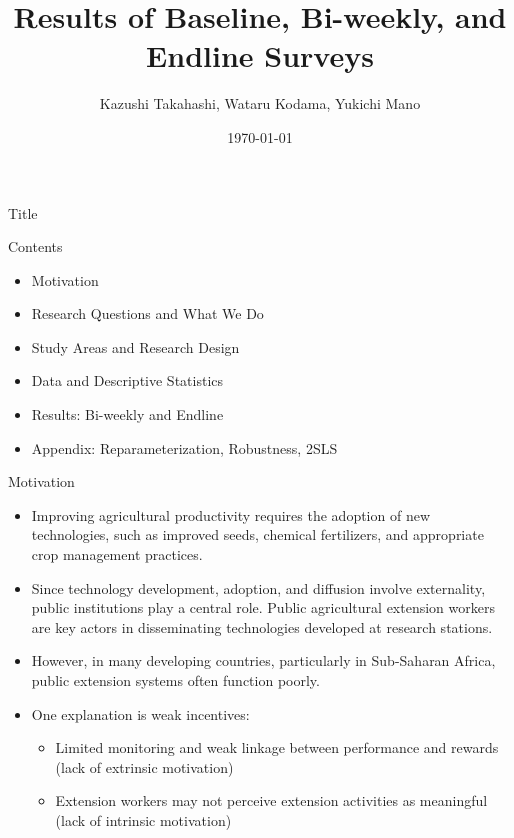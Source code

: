 \documentclass[aspectratio=169]{beamer}
\title[Short Title]{Results of Baseline, Bi-weekly, and Endline Surveys}
\author[Takahashi et al.]{Kazushi Takahashi, Wataru Kodama, Yukichi Mano}
\date{\today}
\begin{document}
	
	\begin{frame}{Title}
		\titlepage
	\end{frame}
	
	\begin{frame}{Contents} %
		\begin{itemize}
			\item Motivation %
			\item Research Questions and What We Do
			\item Study Areas and Research Design
			\item Data and Descriptive Statistics
			\item Results: Bi-weekly and Endline
			\item Appendix: Reparameterization, Robustness, 2SLS
		\end{itemize}
	\end{frame}
\begin{frame}{Motivation}
	
	\begin{itemize}
		\item Improving agricultural productivity requires the adoption of new technologies,
		such as improved seeds, chemical fertilizers, and appropriate crop management practices.
		
		\vspace{0.3cm}
		
		\item Since technology development, adoption, and diffusion involve externality,
		public institutions play a central role.
		Public agricultural extension workers are key actors in disseminating technologies
		developed at research stations.
		
		\vspace{0.3cm}
		
		\item However, in many developing countries, particularly in Sub-Saharan Africa,
		public extension systems often function poorly.
		
		\vspace{0.3cm}
		
		\item One explanation is weak incentives:
		\begin{itemize}
			\item Limited monitoring and weak linkage between performance and rewards
			(lack of extrinsic motivation)
			\item Extension workers may not perceive extension activities as meaningful
			(lack of intrinsic motivation)
		\end{itemize}
		
		\vspace{0.3cm}
		
		
	\end{itemize}
	
\end{frame}
\end{document}
